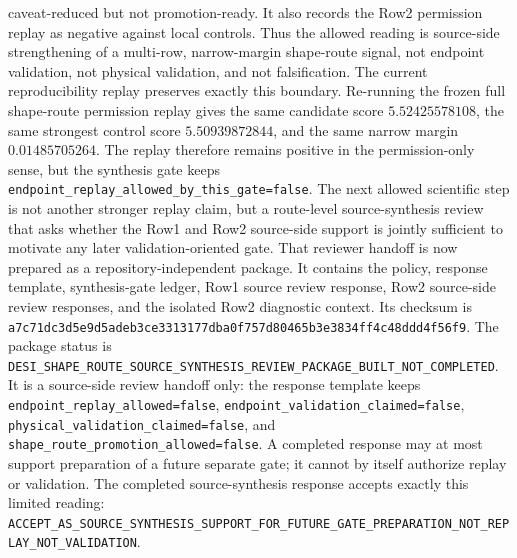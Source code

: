 \documentclass[11pt]{article}
\begin{document}
caveat-reduced but not promotion-ready.  It also records the Row2 permission
replay as negative against local controls.  Thus the allowed reading is
source-side strengthening of a multi-row, narrow-margin shape-route signal, not
endpoint validation, not physical validation, and not falsification.
The current reproducibility replay preserves exactly this boundary.  Re-running
the frozen full shape-route permission replay gives the same candidate score
\(5.52425578108\), the same strongest control score \(5.50939872844\), and the
same narrow margin \(0.01485705264\).  The replay therefore remains positive in
the permission-only sense, but the synthesis gate keeps
\texttt{endpoint\_\allowbreak{}replay\_\allowbreak{}allowed\_\allowbreak{}by\_\allowbreak{}this\_\allowbreak{}gate=\allowbreak{}false}.  The next allowed
scientific step is not another stronger replay claim, but a route-level
source-synthesis review that asks whether the Row1 and Row2 source-side support
is jointly sufficient to motivate any later validation-oriented gate.
That reviewer handoff is now prepared as a repository-independent package.  It
contains the policy, response template, synthesis-gate ledger, Row1 source
review response, Row2 source-side review responses, and the isolated Row2
diagnostic context.  Its checksum is
\texttt{a7c71dc3\allowbreak{}d5e9d5ad\allowbreak{}eb3ce331\allowbreak{}3177dba0\allowbreak{}f757d804\allowbreak{}65b3e383\allowbreak{}4ff4c48d\allowbreak{}dd4f56f9}.
The package status is
\texttt{DESI\_\allowbreak{}SHAPE\_\allowbreak{}ROUTE\_\allowbreak{}SOURCE\_\allowbreak{}SYNTHESIS\_\allowbreak{}REVIEW\_\allowbreak{}PACKAGE\_\allowbreak{}BUILT\_\allowbreak{}NOT\_\allowbreak{}COMPLETED}.
It is a source-side review handoff only: the response template keeps
\texttt{endpoint\_\allowbreak{}replay\_\allowbreak{}allowed=\allowbreak{}false},
\texttt{endpoint\_\allowbreak{}validation\_\allowbreak{}claimed=\allowbreak{}false},
\texttt{physical\_\allowbreak{}validation\_\allowbreak{}claimed=\allowbreak{}false}, and
\texttt{shape\_\allowbreak{}route\_\allowbreak{}promotion\_\allowbreak{}allowed=\allowbreak{}false}.  A completed response may at
most support preparation of a future separate gate; it cannot by itself
authorize replay or validation.
The completed source-synthesis response accepts exactly this limited reading:
\texttt{ACCEPT\_\allowbreak{}AS\_\allowbreak{}SOURCE\_\allowbreak{}SYNTHESIS\_\allowbreak{}SUPPORT\_\allowbreak{}FOR\_\allowbreak{}FUTURE\_\allowbreak{}GATE\_\allowbreak{}PREPARATION\_\allowbreak{}NOT\_\allowbreak{}REPLAY\_\allowbreak{}NOT\_\allowbreak{}VALIDATION}.
\end{document}
